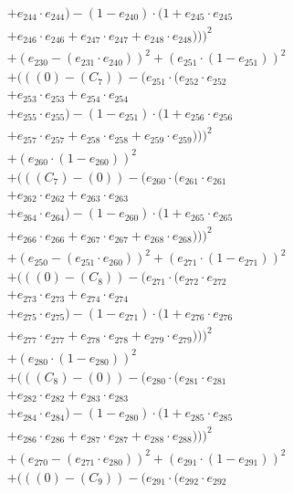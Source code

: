 \documentclass[10pt, a4paper]{article}
\begin{document}
\begin{align*}
& + e_{244} \cdot e_{244}) - (1 - e_{240}) \cdot (1 + e_{245} \cdot e_{245} \\
& + e_{246} \cdot e_{246} + e_{247} \cdot e_{247} + e_{248} \cdot e_{248})))^{2} \\
& + (e_{230} - (e_{231} \cdot e_{240}))^{2} + (e_{251} \cdot (1 - e_{251}))^{2} \\
& + (((0) - (C_{7})) - (e_{251} \cdot (e_{252} \cdot e_{252} \\
& + e_{253} \cdot e_{253} + e_{254} \cdot e_{254} \\
& + e_{255} \cdot e_{255}) - (1 - e_{251}) \cdot (1 + e_{256} \cdot e_{256} \\
& + e_{257} \cdot e_{257} + e_{258} \cdot e_{258} + e_{259} \cdot e_{259})))^{2} \\
& + (e_{260} \cdot (1 - e_{260}))^{2} \\
& + (((C_{7}) - (0)) - (e_{260} \cdot (e_{261} \cdot e_{261} \\
& + e_{262} \cdot e_{262} + e_{263} \cdot e_{263} \\
& + e_{264} \cdot e_{264}) - (1 - e_{260}) \cdot (1 + e_{265} \cdot e_{265} \\
& + e_{266} \cdot e_{266} + e_{267} \cdot e_{267} + e_{268} \cdot e_{268})))^{2} \\
& + (e_{250} - (e_{251} \cdot e_{260}))^{2} + (e_{271} \cdot (1 - e_{271}))^{2} \\
& + (((0) - (C_{8})) - (e_{271} \cdot (e_{272} \cdot e_{272} \\
& + e_{273} \cdot e_{273} + e_{274} \cdot e_{274} \\
& + e_{275} \cdot e_{275}) - (1 - e_{271}) \cdot (1 + e_{276} \cdot e_{276} \\
& + e_{277} \cdot e_{277} + e_{278} \cdot e_{278} + e_{279} \cdot e_{279})))^{2} \\
& + (e_{280} \cdot (1 - e_{280}))^{2} \\
& + (((C_{8}) - (0)) - (e_{280} \cdot (e_{281} \cdot e_{281} \\
& + e_{282} \cdot e_{282} + e_{283} \cdot e_{283} \\
& + e_{284} \cdot e_{284}) - (1 - e_{280}) \cdot (1 + e_{285} \cdot e_{285} \\
& + e_{286} \cdot e_{286} + e_{287} \cdot e_{287} + e_{288} \cdot e_{288})))^{2} \\
& + (e_{270} - (e_{271} \cdot e_{280}))^{2} + (e_{291} \cdot (1 - e_{291}))^{2} \\
& + (((0) - (C_{9})) - (e_{291} \cdot (e_{292} \cdot e_{292} \\

\end{align*}
\end{document}
